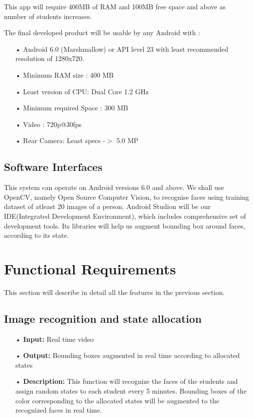 \documentclass{scrreprt}
\begin{document}
This app will require 400MB of RAM and 100MB free space and above as number of students increases.

The final developed product will be usable by any Android with :
\begin{enumerate}

\item[•] Android 6.0 (Marshmallow) or API level 23 with least recommended resolution of 1280x720.
\item[•] Minimum RAM size : 400 MB
\item[•] Least version of CPU: Dual Core 1.2 GHz 
\item[•] Minimum required Space : 300 MB
\item[•] Video : 720p@30fps
\item[•] Rear Camera: Least specs -$>$ 5.0 MP

\end{enumerate}

\section{Software Interfaces}
This system can operate on Android versions 6.0 and above. We shall use OpenCV, namely Open Source Computer Vision, to recognise faces using training dataset of atleast 20 images of a person. Android Studion will be our IDE(Integrated Development Environment), which includes comprehensive set of development tools. Its libraries will help us augment bounding box around faces, according to its state.


\chapter{Functional Requirements}
\label{Functional Requirements}
This section will describe in detail all the features in the previous section.

\section{Image recognition and state allocation}
\begin{enumerate}
\item[•] \textbf{Input:} Real time video
\item[•] \textbf{Output:} Bounding boxes augmented in real time according to allocated states
\item[•] \textbf{Description:} This function will recognize the faces of the students
and assign random states to each student every 5 minutes. Bounding boxes of the color
corresponding to the allocated states will be augmented to the recognized faces in real time.
\end{enumerate}
\end{document}
